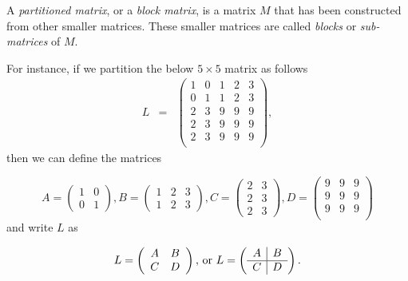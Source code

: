 \documentclass[12pt]{article}
\begin{document}
A \emph{partitioned matrix}, or a \emph{block matrix}, is
 a matrix $M$ that has been constructed from other smaller matrices.
 These smaller matrices are called \emph{blocks} or \emph{sub-matrices}
 of $M$.
 
 For instance, if we partition the below $5\times 5$ matrix
 as follows
 \begin{eqnarray*}
 L&=&\left( \begin{array}{cc|ccc}
 1 & 0 & 1 & 2 & 3 \\
 0 & 1 & 1 & 2 & 3 \\
 \hline
 2 & 3 & 9 & 9 & 9 \\
 2 & 3 & 9 & 9 & 9 \\
 2 & 3 & 9 & 9 & 9 \\
 \end{array} \right),
 \end{eqnarray*}
 then we can define the matrices

\begin{equation*}
A=\left( \begin{array}{cc}
 1 & 0 \\
 0 & 1
 \end{array} \right),
 B=\left( \begin{array}{ccc}
 1 & 2 & 3\\
 1 & 2 & 3
 \end{array} \right),
 C=\left( \begin{array}{cc}
 2 & 3 \\
 2 & 3 \\
 2 & 3
 \end{array} \right),
 D=\left( \begin{array}{ccc}
 9 & 9 & 9 \\
 9 & 9 & 9 \\
 9 & 9 & 9 \\
 \end{array} \right)
\end{equation*}
and write $L$ as

\begin{equation*}
 L=\left( \begin{array}{cc}
 A & B \\
 C & D
 \end{array} \right),\, \mbox{or\,\,}
 L=\left( \begin{array}{c|c}
 A & B \\
\hline
 C & D
 \end{array} \right).
\end{equation*}
\end{document}
